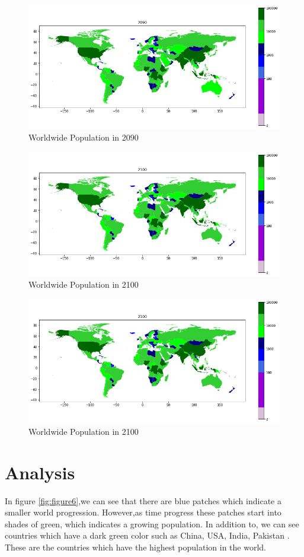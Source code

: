 \documentclass[a4paper, 11pt]{article}
\begin{document}
\begin{figure}[h!]
    \centering
    \includegraphics[width=0.9 \textwidth]{Images_Q2/2090.png}
    \caption{Worldwide Population in 2090}
    \label{fig:figure20}
\end{figure}
\newpage
\begin{figure}[h!]
    \centering
    \includegraphics[width=0.9 \textwidth]{Images_Q2/2100.png}
    \caption{Worldwide Population in 2100}
    \label{fig:figure21}
\end{figure}

\begin{figure}[h!]
    \centering
    \includegraphics[width=0.9 \textwidth]{Images_Q2/2100.png}
    \caption{Worldwide Population in 2100}
    \label{fig:figure22}
\end{figure}

\section{Analysis}
In figure \ref{fig:figure6},we can see that there are blue patches which indicate a smaller world progression. However,as time progress these patches start into shades of green, which indicates a growing population. In addition to, we can see countries which have a dark green color such as China, USA, India, Pakistan . These are the countries which have the highest population in the world.
\end{document}
